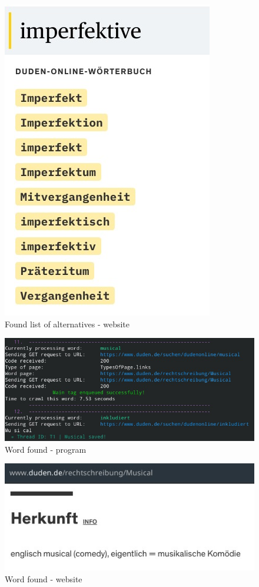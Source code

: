 \documentclass{article}
\begin{document}
\begin{figure}[h]
	\caption{Found list of alternatives - website}
	\centering
	\includegraphics[scale=0.5]{6}
\end{figure}


\begin{figure}[h]
	\caption{Word found - program}
	\centering
	\includegraphics[scale=0.5]{7}
\end{figure}

\begin{figure}[h]
	\caption{Word found - website}
	\centering
	\includegraphics[scale=0.5]{8}
\end{figure}


\end{document}
